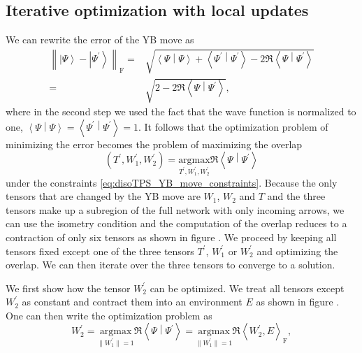 \subsection{Iterative optimization with local updates}
\label{sec:YB_move_iterative_local_optimization}
We can rewrite the error of the YB move as
\begin{equation}
	\begin{split}
		\left\lVert \left|\Psi\right\rangle - \left|\Psi^\prime\right\rangle \right\rVert_\text{F} =& \sqrt{\left\langle\Psi\middle|\Psi\right\rangle + \left\langle\Psi^\prime\middle|\Psi^\prime\right\rangle - 2\Re\left\langle\Psi\middle|\Psi^\prime\right\rangle} \\
		=& \sqrt{2 - 2\Re\left\langle\Psi\middle|\Psi^\prime\right\rangle},
	\end{split}
\end{equation}
where in the second step we used the fact that the wave function is normalized to one, $\left\langle\Psi\middle|\Psi\right\rangle = \left\langle\Psi^\prime\middle|\Psi^\prime\right\rangle = 1$. It follows that the optimization problem of minimizing the error becomes the problem of maximizing the overlap
\begin{equation}
	\label{eq:disoTPS_YB_move_alternative_formulation}
	\left(T^\prime, W_1^\prime, W_2^\prime\right) = \underset{T^\prime,W_1^\prime,W_2^\prime}{\text{argmax}}\Re\left\langle\Psi\middle|\Psi^\prime\right\rangle
\end{equation}
under the constraints \eqref{eq:disoTPS_YB_move_constraints}. Because the only tensors that are changed by the YB move are $W_1$, $W_2$ and $T$ and the three tensors make up a subregion of the full network with only incoming arrows, we can use the isometry condition and the computation of the overlap reduces to a contraction of only six tensors as shown in figure . We proceed by keeping all tensors fixed except one of the three tensors $T^\prime$, $W_1^\prime$ or $W_2^\prime$ and optimizing the overlap. We can then iterate over the three tensors to converge to a solution. \par
We first show how the tensor $W_2^\prime$ can be optimized. We treat all tensors except $W_2^\prime$ as constant and contract them into an environment $E$ as shown in figure . One can then write the optimization problem as
\begin{equation}
	\label{eq:disoTPS_YB_move_optimization_problem_W_2_prime}
	W_2^\prime = \underset{\lVert W_1^\prime \rVert = 1}{\text{argmax}} \Re\left\langle\Psi\middle|\Psi^\prime\right\rangle = \underset{\lVert W_1^\prime \rVert = 1}{\text{argmax}} \Re\left\langle W_2^\prime, E \right\rangle_\text{F},
\end{equation}
